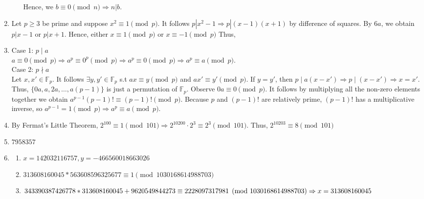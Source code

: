 \documentclass[10pt]{article}
\begin{document}
\begin{enumerate}[label= \arabic*.]
\begin{enumerate}
        Hence, we $b\equiv 0\pmod{n}\Rightarrow n|b$.
    \end{enumerate}
    \item Let $p\ge3$ be prime and suppose $x^2\equiv1\pmod{p}$. It follows $p|x^2-1\Rightarrow p| (x-1) (x+1)$ by difference of squares. 
    By $6a$, we obtain $p|x-1$ or $p|x+1$. Hence, either $x\equiv 1\pmod{p}$ or $x\equiv-1\pmod{p}$
    Thus, 
    \item Case 1: $p\mid a$\\
    $a\equiv 0\pmod{p}\Rightarrow a^p\equiv 0^p\pmod{p}\Rightarrow a^p\equiv 0\pmod{p}\Rightarrow a^p\equiv a\pmod{p}$.\\
    Case 2: $p\nmid a$\\
    Let $x,x'\in\mathbb{F}_p$. 
    It follows $\exists y,y'\in\mathbb{F}_p$ s.t $ax\equiv y\pmod{p}$ and $ax'\equiv y'\pmod{p}$.
    If $y=y'$, then $p\mid a(x-x')\Rightarrow p\mid(x-x')\Rightarrow x=x'$.
    Thus, $\{0a,a,2a,\ldots,a(p-1)\}$ is just a permutation of $\mathbb{F}_p$.
    Observe $0a\equiv 0\pmod{p}$.
    It follows by multiplying all the non-zero elements together we obtain $a^{p-1}(p-1)!\equiv (p-1)!\pmod{p}$.
    Because $p$ and $(p-1)!$ are relatively prime, $(p-1)!$ has a multiplicative inverse, so $a^{p-1}=1\pmod{p}\Rightarrow a^p\equiv a\pmod{p}$.\\
    \item By Fermat's Little Theorem, $2^{100}\equiv 1\pmod{101}\Rightarrow 2^{10200}\cdot 2^3\equiv 2^3\pmod{101}$. 
    Thus, $2^{10203}\equiv 8\pmod{101}$
    \item $7958357$
    \item \begin{enumerate}
        \item $x=142032116757,y=-466560018663026$
        \item $313608160045*563608596325677\equiv 1\pmod{1030168614988703}$
        \item $343390387426778*313608160045+9620549844273\equiv 2228097317981\pmod{1030168614988703}\\
        \Rightarrow x=313608160045$
    \end{enumerate}
\end{enumerate}

\end{document}
